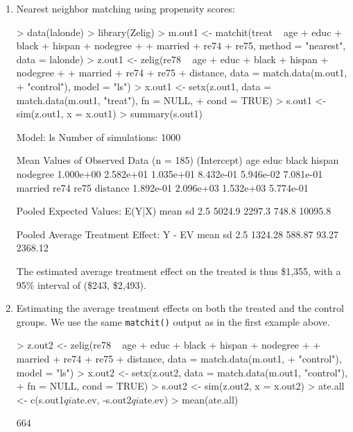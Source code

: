\begin{enumerate}
\item Nearest neighbor matching using propensity scores: 

\begin{Schunk}
\begin{Sinput}
> data(lalonde)
> library(Zelig)
> m.out1 <- matchit(treat ~ age + educ + black + hispan + nodegree + 
+     married + re74 + re75, method = "nearest", data = lalonde)
> z.out1 <- zelig(re78 ~ age + educ + black + hispan + nodegree + 
+     married + re74 + re75 + distance, data = match.data(m.out1, 
+     "control"), model = "ls")
> x.out1 <- setx(z.out1, data = match.data(m.out1, "treat"), fn = NULL, 
+     cond = TRUE)
> s.out1 <- sim(z.out1, x = x.out1)
> summary(s.out1)
\end{Sinput}
\begin{Soutput}

  Model: ls 
  Number of simulations: 1000 

Mean Values of Observed Data (n = 185) 
(Intercept)         age        educ       black      hispan    nodegree 
  1.000e+00   2.582e+01   1.035e+01   8.432e-01   5.946e-02   7.081e-01 
    married        re74        re75    distance 
  1.892e-01   2.096e+03   1.532e+03   5.774e-01 

Pooled Expected Values: E(Y|X)
   mean      sd    2.5%   97.5% 
 5024.9  2297.3   748.8 10095.8 

Pooled Average Treatment Effect: Y - EV
   mean      sd    2.5%   97.5% 
1324.28  588.87   93.27 2368.12 

\end{Soutput}
\end{Schunk}
  
The estimated average treatment effect on the treated is thus \$1,355, with a 95\% interval
of (\$243, \$2,493).

\item Estimating the average treatment effects on both the treated and
  the control groups. We use the same {\tt matchit()} output as in the
  first example above.

\begin{Schunk}
\begin{Sinput}
> z.out2 <- zelig(re78 ~ age + educ + black + hispan + nodegree + 
+     married + re74 + re75 + distance, data = match.data(m.out1, 
+     "control"), model = "ls")
> x.out2 <- setx(z.out2, data = match.data(m.out1, "control"), 
+     fn = NULL, cond = TRUE)
> s.out2 <- sim(z.out2, x = x.out2)
> ate.all <- c(s.out1$qi$ate.ev, -s.out2$qi$ate.ev)
> mean(ate.all)
\end{Sinput}
\begin{Soutput}
[1] 664


\end{Soutput}
\end{Schunk}
\end{enumerate}
